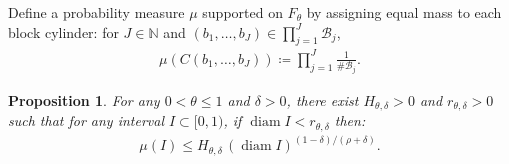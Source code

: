 \documentclass[12pt,reqno]{amsart}
\theoremstyle{definition}
\theoremstyle{plain}
\newtheorem{prop}{Proposition}
\begin{document}
Define a probability measure $\mu$ supported on $F_\theta$ by assigning equal mass to each block cylinder: for $J\in\mathbb{N}$ and $(b_1,\ldots,b_J)\in\prod_{j=1}^J\mathcal{B}_j$, 
\begin{align*}
    \mu{\left(C(b_1,\ldots,b_J)\right)}
    \coloneqq\prod_{j=1}^J \frac{1}{\#\mathcal{B}_j}.
\end{align*}
\begin{prop}\label{prop: thm 1 prop 2.5}
    For any $0<\theta\leq1$ and $\delta>0$, there exist $H_{\theta,\delta}>0$ and $r_{\theta,\delta}>0$ such that for any interval $I\subset[0,1)$, if $\operatorname{diam}{I}<r_{\theta,\delta}$ then:
    \begin{align*}
        \mu{(I)}
        \leq H_{\theta,\delta}\,(\operatorname{diam}{I})^{(1-\delta)/(\rho+\delta)}.
    \end{align*}
\end{prop}
\end{document}
